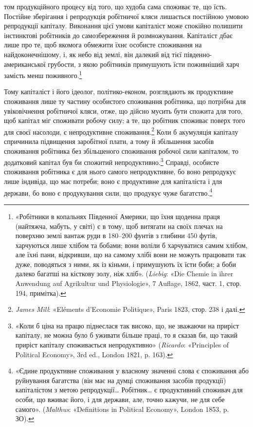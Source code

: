 \parcont{}  %
том продукційного процесу від того, що худоба сама споживає
те, що їсть. Постійне зберігання і репродукція робітничої кляси
лишається постійною умовою репродукції капіталу. Виконання
цієї умови капіталіст може спокійно полишити інстинктові
робітників до самозбереження й розмножування. Капіталіст
дбає лише про те, щоб якомога обмежити їхнє особисте споживання
на найдоконечнішому, і, як небо від землі, він далекий від
тієї південно-американської грубости, з якою робітників примушують
їсти поживніший харч замість менш поживного.\footnote{
«Робітники в копальнях Південної Америки, що їхня щоденна
праця (найтяжча, мабуть, у світі) є в тому, щоб витягати на своїх плечах
на поверхню землі вантаж руди в 180--200 фунтів з глибини 450 футів,
харчуються лише хлібом та бобами; вони воліли б харчуватися
самим хлібом, але їхні пани, відкривши, що на самому хлібі вони не
можуть працювати так дуже, поводяться з ними, як із кіньми, і примушують
їх їсти боби; а боби далеко багатші на кісткову золу, ніж хліб».
(\emph{Liebig}: «Die Chemie in ihrer Anwendung auf Agrikultur und Physiologie»,
7 Auflage, 1862, част. 1, стор. 194, примітка).
}

Тому капіталіст і його ідеолог, політико-економ, розглядають
як продуктивне споживання лише ту частину особистого споживання
робітника, що потрібна для увіковічнення робітничої
кляси, отже, що дійсно мусить бути спожита для того, щоб капітал
міг споживати робочу силу; а те, що робітник споживає поверх
того для своєї насолоди, є непродуктивне споживання.\footnote{
\emph{James Mill}: «Eléments d’Economie Politique», Paris 1823, стор. 238
і далі.
}
Коли б акумуляція капіталу спричинила підвищення заробітної
плати, а тому й збільшення засобів споживання робітника без
збільшеного споживання робочої сили капіталом, то додатковий
капітал був би спожитий непродуктивно.\footnote{
«Коли б ціна на працю піднеслася так високо, що, не зважаючи
на приріст капіталу, не можна було б уживати більше праці, то я сказав
би, що такий приріст капіталу споживається непродуктивно» (\emph{Ricardo}:
«Principles of Political Economy», 3rd ed., London 1821, p. 163).
} Справді, особисте
споживання робітника є для нього самого непродуктивне, бо воно
репродукує лише індивіда, що має потреби; воно є продуктивне
для капіталіста і для держави, бо воно є продукування сили,
що продукує чуже багатство.\footnote{
«Єдине продуктивне споживання у власному значенні слова є
споживання або руйнування багатства (він має на думці споживання
засобів продукції) капіталістом з метою репродукції\dots{} Робітник\dots{} є
продуктивний споживач для особи, що вживає його, і для держави, але,
точно кажучи, не для себе самого». (\emph{Malthus}: «Definitions in Political
Economy», London 1853, p. ЗО).
}

